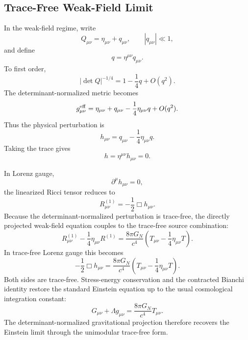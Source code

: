 \documentclass[11pt]{article}
\begin{document}
\subsection{Trace-Free Weak-Field Limit}

In the weak-field regime, write
\begin{equation}
Q_{\mu\nu}
=
\eta_{\mu\nu}+q_{\mu\nu},
\qquad
|q_{\mu\nu}|\ll1,
\end{equation}
and define
\begin{equation}
q=\eta^{\mu\nu}q_{\mu\nu}.
\end{equation}
To first order,
\begin{equation}
|\det Q|^{-1/4}
=
1-\frac14 q+O(q^2).
\end{equation}
The determinant-normalized metric becomes
\begin{equation}
g_{\mu\nu}^{\rm eff}
=
\eta_{\mu\nu}
+
q_{\mu\nu}
-
\frac14\eta_{\mu\nu}q
+
O(q^2).
\end{equation}
Thus the physical perturbation is
\begin{equation}
\boxed{
h_{\mu\nu}
=
q_{\mu\nu}
-
\frac14\eta_{\mu\nu}q.
}
\end{equation}
Taking the trace gives
\begin{equation}
\boxed{
h=\eta^{\mu\nu}h_{\mu\nu}=0.
}
\end{equation}

In Lorenz gauge,
\begin{equation}
\partial^\mu h_{\mu\nu}=0,
\end{equation}
the linearized Ricci tensor reduces to
\begin{equation}
R_{\mu\nu}^{(1)}
=
-\frac12\Box h_{\mu\nu}.
\end{equation}
Because the determinant-normalized perturbation is trace-free, the directly
projected weak-field equation couples to the trace-free source combination:
\begin{equation}
\boxed{
R_{\mu\nu}^{(1)}
-
\frac14\eta_{\mu\nu}R^{(1)}
=
\frac{8\pi G_N}{c^4}
\left(
T_{\mu\nu}
-
\frac14\eta_{\mu\nu}T
\right).
}
\end{equation}
In trace-free Lorenz gauge this becomes
\begin{equation}
\boxed{
-\frac12\Box h_{\mu\nu}
=
\frac{8\pi G_N}{c^4}
\left(
T_{\mu\nu}
-
\frac14\eta_{\mu\nu}T
\right).
}
\end{equation}
Both sides are trace-free. Stress-energy conservation and the contracted Bianchi
identity restore the standard Einstein equation up to the usual cosmological
integration constant:
\begin{equation}
\boxed{
G_{\mu\nu}
+
\Lambda g_{\mu\nu}
=
\frac{8\pi G_N}{c^4}T_{\mu\nu}.
}
\end{equation}
The determinant-normalized gravitational projection therefore recovers the
Einstein limit through the unimodular trace-free form.
\end{document}
